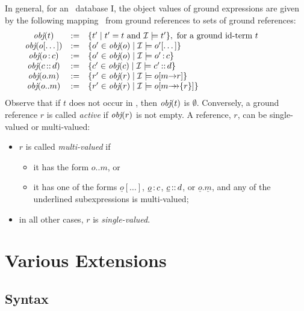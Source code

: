 \documentclass[11pt]{report}
\begin{document}
In general, for an \fl\ database \db I, the object values of ground
expressions are given by the following mapping \obj\ from ground references
to sets of ground references:
%
\begin{displaymath}
  \begin{array}{cll@{\hspace{4em}}c}
    \obj(t) & := & \{t' \mid t'=t \textrm{ and } \db I\models t' \}, 
     \textrm{ for a ground id-term $t$}  \\   
    \obj(o[\dots]) & :=& \{o'\in\obj(o) \mid \db I \models o'[\dots]
    \} \\  
    \obj(o\isa c) & := & \{o'\in\obj(o) \mid \db I \models o'\isa c\}
     \\ 
    \obj(c\subcl d) & := & \{c'\in\obj(c) \mid \db I \models c'\subcl
    d\} \\ 
    \obj(o.m) & :=  & \{r'\in\obj(r) \mid \db I \models o[m\fd
    r]\} \\ 
    \obj(o..m) & := &  \{ r'\in\obj(r) \mid \db I \models
    o[m{\mvd}\{r\}] \}
  \end{array}
\end{displaymath}
Observe that if $t$ does not occur in , then $\textit{obj}(t)$ is
$\emptyset$.  Conversely, a ground reference $r$ is called \emph{active} if
$\textit{obj}(r)$ is not empty. A reference, $r$, can be 
single-valued or multi-valued:
\begin{itemize}
\item $r$ is called \emph{multi-valued} if
 \begin{itemize}
  \item it has the form $o..m$, or 
  \item it has one of the forms $\underline{o}[\dots]$,
    $\underline{o}\,{\bf{:}}\, c$, $\underline{c}\,{\bf{::}}\, d$, or
    $\underline{o}.\underline{m}$, and any of the underlined
    subexpressions is multi-valued;
 \end{itemize}
\item in all other cases, $r$ is \emph{single-valued}.
\end{itemize}

\section{Various Extensions}

\subsection{\FLORA Syntax}
\end{document}
